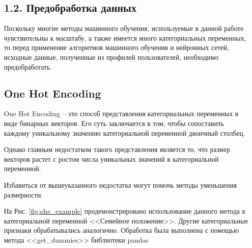 \subsection{1.2. Предобработка данных}

Поскольку многие методы машинного обучения, используемые в данной работе чувствительны к масштабу, а также имеется много категориальных переменных, то перед применение алгоритмов машинного обучения и нейронных сетей, исходные данные, полученные из профилей пользователей, необходимо предобработать.



\subsection*{One Hot Encoding}

One Hot Encoding -- это способ представления категориальных переменных в виде бинарных векторов. Его суть заключается в том, чтобы сопоставить каждому уникальному значению категориальной переменной двоичный столбец. 

Однако главным недостатком такого представления является то, что размер векторов растет с ростом числа уникальных значений в категориальной переменной. 

Избавиться от вышеуказанного недостатка могут помочь методы уменьшения размерности.

На Рис. \ref{fig:ohe_example} продемонстрировано использование данного метода к категориальной переменной <<Семейное положение>>.  Другие категориальные признаки обрабатывались аналогично. Обработка была выполнена с помощью метода <<get\_dummies>> библиотеки pandas \cite{pandas} 

